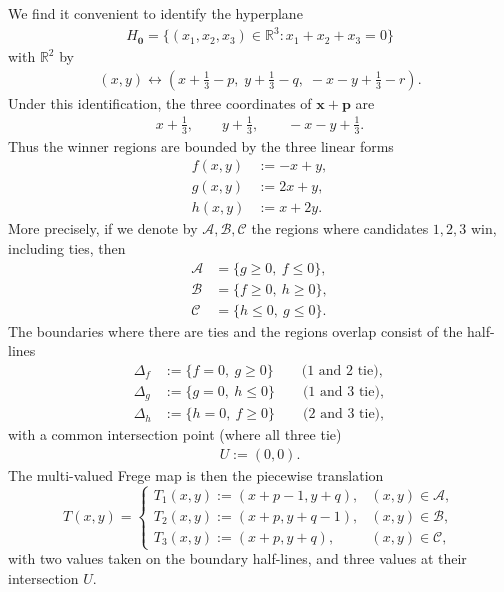 \documentclass[11pt,reqno,tbtags,a4paper]{amsart}
\numberwithin{equation}{section}
\renewcommand\le{\leq}
\renewcommand\ge{\geq}
\renewcommand\leq{\leqslant}
\renewcommand\geq{\geqslant}
\theoremstyle{plain}%
\theoremstyle{definition}
\theoremstyle{remark}
\newcounter{cases}
\newcommand\bbR{\mathbb R}
\newcommand\cA{\mathcal A}
\newcommand\cB{\mathcal B}
\newcommand\cC{\mathcal C}
\newcommand\Ho{H_{\0}}
\newcommand\vp{\mathbf{p}}
\newcommand\vx{\mathbf{x}}
\newcommand\0{{\boldsymbol 0}}
\newcommand\1{{\boldsymbol 1}}
\begin{document}
We find it convenient to identify the hyperplane
\begin{align}
  \Ho=\{(x_1,x_2,x_3)\in\bbR^3:x_1+x_2+x_3=0\}
\end{align}
with $\bbR^2$ by
\begin{align}
  (x,y)\longleftrightarrow (x+\tfrac13-p,\;y+\tfrac13-q,\;-x-y+\tfrac13-r).
\end{align}
Under this identification, the three coordinates of $\vx+\vp$ are
\begin{align}\label{xy3}
   x+\tfrac13,\qquad y+\tfrac13,\qquad -x-y+\tfrac13.
\end{align}
Thus the winner regions are bounded by the three linear forms
\begin{align}
 f(x,y)&:=-x+y,\label{m3-f}\\
 g(x,y)&:=2x+y,\label{m3-g}\\
 h(x,y)&:=x+2y.\label{m3-h}
\end{align}
More precisely, if we denote by $\cA,\cB,\cC$ the regions where candidates
$1,2,3$ win, including ties, then
\begin{align}
\cA&=\{g\ge0,\ f\le0\},\label{m3-cA}\\
\cB&=\{f\ge0,\ h\ge0\},\label{m3-cB}\\
\cC&=\{h\le0,\ g\le0\}.\label{m3-cC}
\end{align}
The boundaries where there are ties and the regions overlap consist of
the half-lines
\begin{align}
\Delta_f&:=\{f=0,\ g\ge0\}
\qquad\text{(1 and 2 tie)},\\
\Delta_g&:=\{g=0,\ h\le0\}
\qquad\text{(1 and 3 tie)},\\
\Delta_h&:=\{h=0,\ f\ge0\}
\qquad\text{(2 and 3 tie)},
\end{align}
with a common intersection point (where all three tie)
%
\begin{align}\label{U00}
U :=(0,0).
\end{align}
The multi-valued Frege map is then the piecewise translation
\begin{equation}\label{m3-T}
T(x,y)=
\begin{cases}
T_1(x,y):=(x+p-1,y+q),& (x,y)\in\cA,\\
T_2(x,y):=(x+p,y+q-1),& (x,y)\in\cB,\\
T_3(x,y):=(x+p,y+q),& (x,y)\in\cC,
\end{cases}
\end{equation}
with two  values taken on the boundary half-lines, and three values at their
intersection $U$.
\end{document}
